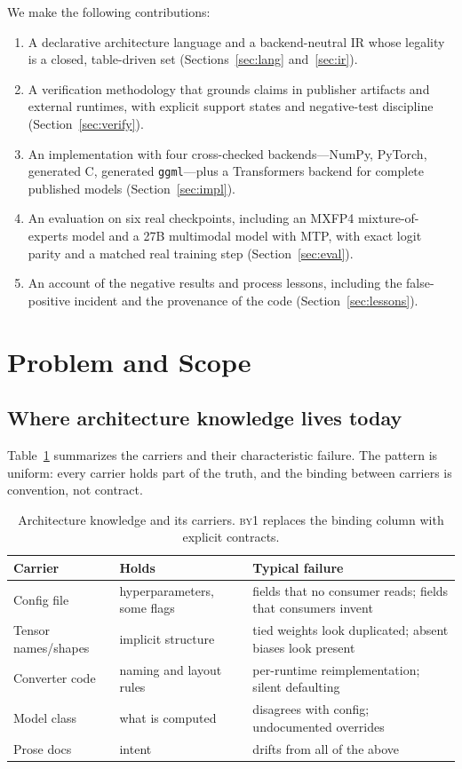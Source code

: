 \documentclass[11pt,a4paper]{article}
\newcommand{\code}[1]{\texttt{#1}}
\newcommand{\byone}{\textsc{by1}}
\begin{document}
We make the following contributions:
\begin{enumerate}
  \item A declarative architecture language and a backend-neutral IR whose
  legality is a closed, table-driven set (Sections~\ref{sec:lang} and~\ref{sec:ir}).
  \item A verification methodology that grounds claims in publisher artifacts
  and external runtimes, with explicit support states and negative-test
  discipline (Section~\ref{sec:verify}).
  \item An implementation with four cross-checked backends---NumPy, PyTorch,
  generated C, generated \code{ggml}---plus a Transformers backend for
  complete published models (Section~\ref{sec:impl}).
  \item An evaluation on six real checkpoints, including an MXFP4
  mixture-of-experts model and a 27B multimodal model with MTP, with exact
  logit parity and a matched real training step (Section~\ref{sec:eval}).
  \item An account of the negative results and process lessons, including the
  false-positive incident and the provenance of the code
  (Section~\ref{sec:lessons}).
\end{enumerate}

\section{Problem and Scope}
\label{sec:problem}

\subsection{Where architecture knowledge lives today}

Table~\ref{tab:carriers} summarizes the carriers and their characteristic
failure. The pattern is uniform: every carrier holds part of the truth, and
the binding between carriers is convention, not contract.

\begin{table}[t]
\centering
\caption{Architecture knowledge and its carriers. \byone{} replaces the
binding column with explicit contracts.}
\label{tab:carriers}
\begin{tabular}{@{}p{3.2cm}p{4.6cm}p{5.4cm}@{}}
\toprule
Carrier & Holds & Typical failure \\
\midrule
Config file & hyperparameters, some flags & fields that no consumer reads;
fields that consumers invent \\
Tensor names/shapes & implicit structure & tied weights look duplicated;
absent biases look present \\
Converter code & naming and layout rules & per-runtime reimplementation;
silent defaulting \\
Model class & what is computed & disagrees with config; undocumented
overrides \\
Prose docs & intent & drifts from all of the above \\
\bottomrule
\end{tabular}
\end{table}
\end{document}
